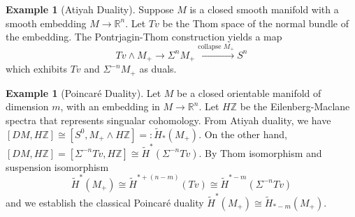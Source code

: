 \documentclass{article}
\theoremstyle{definition}
\newtheorem{example}[theorem]{Example}
\begin{document}
\begin{tcolorbox}[colback=yellow!5!white,colframe=yellow!30!white]
\begin{example}[Atiyah Duality]
Suppose $M$ is a closed smooth manifold with a smooth embedding $M\to \mathbb{R}^n$. Let $Tv$ be the Thom space of the normal bundle of the embedding. The Pontrjagin-Thom construction yields a map 
\[Tv\wedge M_+\to \Sigma^nM_+\xrightarrow{\textrm{collapse } M_+}S^n\]
which exhibits $Tv$ and $\Sigma^{-n}M_+$ as duals.
\end{example}
\end{tcolorbox}


\begin{tcolorbox}[colback=yellow!5!white,colframe=yellow!30!white]
\begin{example}[Poincar\'e Duality]
Let $M$ be a closed orientable manifold of dimension $m$, with an embedding in $M\to \mathbb{R}^n$. Let $H \mathbb{Z}$ be the Eilenberg-Maclane spectra that represents singualar cohomology. From Atiyah duality, we have $[DM,H \mathbb{Z}]\cong [S^0, M_+\wedge H \mathbb{Z}]=: \tilde{H}_*(M_+)$. On the other hand, $[DM, H \mathbb{Z}]=[\Sigma^{-n}Tv, H \mathbb{Z}]\cong \tilde{H}^{*}(\Sigma^{-n}Tv)$. By Thom isomorphism and suspension isomorphism
\[\tilde{H}^*(M_+)\cong \tilde{H}^{*+(n-m)}(Tv)\cong \tilde{H}^{*-m}(\Sigma^{-n}Tv)\]
and we establish the classical Poincar\'e duality $\tilde{H}^*(M_+)\cong \tilde{H}_{*-m}(M_+)$.
\end{example}
\end{tcolorbox}
\end{document}
